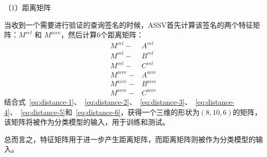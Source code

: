 （1）距离矩阵

当收到一个需要进行验证的查询签名的时候，ASSV首先计算该签名的两个特征矩阵：$M^{vel}$ 和 $M^{acce}$，然后计算6个距离矩阵：
\begin{align}
M^{vel} -& A^{vel}  \label{eq:distance-1} \\
M^{vel} -& B^{vel}  \label{eq:distance-2} \\
M^{vel} -& C^{vel}  \label{eq:distance-3} \\
M^{acce} -& A^{acce} \label{eq:distance-4} \\
M^{acce} -& B^{acce} \label{eq:distance-5} \\
M^{acce} -& C^{acce} \label{eq:distance-6}
\end{align}
结合式~\ref{eq:distance-1}、~\ref{eq:distance-2}、~\ref{eq:distance-3}、~\ref{eq:distance-4}、~\ref{eq:distance-5}和~\ref{eq:distance-6}，获得一个三维的形状为$(8,10,6)$的矩阵，该矩阵将被作为分类模型的输入，用于训练和测试。

总而言之，特征矩阵用于进一步产生距离矩阵，而距离矩阵则被作为分类模型的输入。

